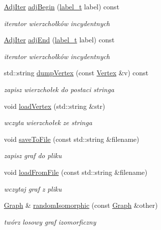 \begin{DoxyCompactItemize}
\hyperlink{classGraph_1_1AdjIter}{Adj\-Iter} \hyperlink{classGraph_a3319a876a8ca646b9095c0ff0be154ac}{adj\-Begin} (\hyperlink{classGraph_a2237a0ada8484c37b8200c0e3685ca71}{label\-\_\-t} label) const 
\begin{DoxyCompactList}\small\item\em iterator wierzchołków incydentnych \end{DoxyCompactList}\item 
\hyperlink{classGraph_1_1AdjIter}{Adj\-Iter} \hyperlink{classGraph_a359f0041dfa65eec7d1d658200f19a2a}{adj\-End} (\hyperlink{classGraph_a2237a0ada8484c37b8200c0e3685ca71}{label\-\_\-t} label) const 
\begin{DoxyCompactList}\small\item\em iterator wierzchołków incydentnych \end{DoxyCompactList}\item 
std\-::string \hyperlink{classGraph_ae82fbe23587b4650fe1356b0fb72645e}{dump\-Vertex} (const \hyperlink{classVertex}{Vertex} \&v) const 
\begin{DoxyCompactList}\small\item\em zapisz wierzchołek do postaci stringa \end{DoxyCompactList}\item 
void \hyperlink{classGraph_ad12b2c8e5fe1cebfd477de21ac94d430}{load\-Vertex} (std\-::string \&str)
\begin{DoxyCompactList}\small\item\em wczyta wierzchołek ze stringa \end{DoxyCompactList}\item 
void \hyperlink{classGraph_a30e5863626904c020da9ca97044786c0}{save\-To\-File} (const std\-::string \&filename)
\begin{DoxyCompactList}\small\item\em zapisz graf do pliku \end{DoxyCompactList}\item 
void \hyperlink{classGraph_a2d059878df5c617afb415cc1f4cd8dbc}{load\-From\-File} (const std\-::string \&filename)
\begin{DoxyCompactList}\small\item\em wczytaj graf z pliku \end{DoxyCompactList}\item 
\hyperlink{classGraph}{Graph} \& \hyperlink{classGraph_a5f50072f6f495e94211b6d59cfcd0acf}{random\-Isomorphic} (const \hyperlink{classGraph}{Graph} \&other)
\begin{DoxyCompactList}\small\item\em twórz losowy graf izomorficzny \end{DoxyCompactList}\end{DoxyCompactItemize}
